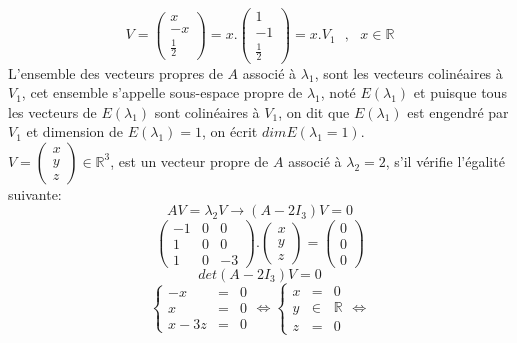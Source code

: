 \documentclass[a4paper,12pt,french]{article}
\begin{document}
\[V=\begin{pmatrix}
	x  \\
	-x  \\
	\frac{1}{2}
	
\end{pmatrix}=x.\begin{pmatrix}
1  \\
-1  \\
\frac{1}{2}

\end{pmatrix}=x.V_{1}~~~,~~~ x \in \mathbb{R}\]
L'ensemble des vecteurs propres de $A$ associé à $\lambda_{1}$, sont les vecteurs colinéaires à $V_{1}$, cet ensemble s'appelle sous-espace propre de $\lambda_{1}$, noté $E(\lambda_{1})$ et puisque tous les vecteurs de $E(\lambda_{1})$ sont colinéaires à $V_{1}$, on dit que $E(\lambda_{1})$ est engendré par $V_{1}$ et dimension de $E(\lambda_{1})=1$, on écrit $dim E(\lambda_{1}=1)$.\\
$V=\begin{pmatrix}
	x  \\
	y  \\
	z
	
\end{pmatrix} \in \mathbb{R}^{3}$, est un vecteur propre de $A$ associé à $\lambda_{2}=2$, s'il vérifie l'égalité suivante:\\
\[AV=\lambda_{2}V \rightarrow (A-2I_{3})V=0\]
\[\begin{pmatrix}
	-1 & 0 & 0  \\
	1 & 0 & 0 \\
	1 & 0 & -3
	
\end{pmatrix}.\begin{pmatrix}
	x   \\
	y   \\
	z 
	
\end{pmatrix}=\begin{pmatrix}
	0   \\
	0  \\
	0 
	
\end{pmatrix}\] 
\[det(A-2I_{3})V=0\]
\[\left \{
\begin{array}{rcl}
	-x&=&0 \\
	x&=&0\\
	x-3z&=&0
\end{array}
\right. \Leftrightarrow \left \{
\begin{array}{rcl}
x&=&0 \\
	y& \in& \mathbb{R}\\
	z&=&0
\end{array}
\right.\Leftrightarrow \]
\end{document}
